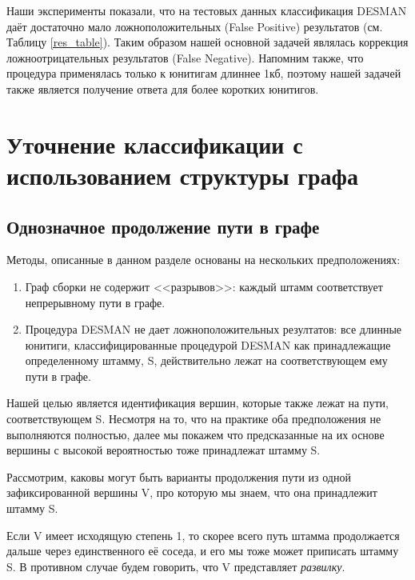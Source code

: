 \documentclass{spbau-diploma}
\begin{document}
Наши эксперименты показали, что на тестовых данных классификация DESMAN даёт достаточно мало ложноположительных (False Positive) результатов (см. Таблицу \ref{res_table}). Таким образом нашей основной задачей являлась коррекция ложноотрицательных результатов (False Negative). Напомним также, что процедура применялась только к юнитигам длиннее 1кб, поэтому нашей задачей также является получение ответа для более коротких юнитигов. 




\section{Уточнение классификации с использованием структуры графа}
\subsection{Однозначное продолжение пути в графе}
Методы, описанные в данном разделе основаны на нескольких предположениях: 
\begin{enumerate}
    \item Граф сборки не содержит <<разрывов>>: каждый штамм соответствует непрерывному пути в графе.
    \item Процедура DESMAN не дает ложноположительных резултатов: все длинные юнитиги, классифицированные процедурой DESMAN как принадлежащие определенному штамму, S, действительно лежат на соответствующем ему пути в графе. 
\end{enumerate}

Нашей целью является идентификация вершин, которые также лежат на пути, соответствующем S. Несмотря на то, что на практике оба предположения не выполняются полностью, далее мы покажем что предсказанные на их основе вершины с высокой вероятностью тоже принадлежат штамму S.

Рассмотрим, каковы могут быть варианты продолжения пути из одной зафиксированной вершины V, про которую мы знаем, что она принадлежит штамму S.

Если V имеет исходящую степень 1, то скорее всего путь штамма продолжается дальше через единственного её соседа, и его мы тоже может приписать штамму S.
В противном случае будем говорить, что V представляет \textit{развилку}.
\end{document}
